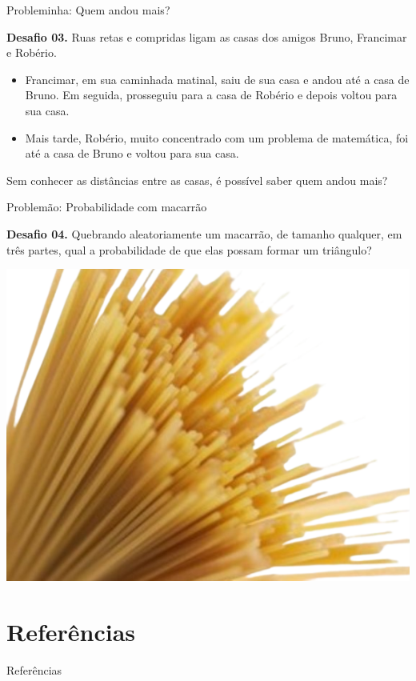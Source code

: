 \documentclass[12pt]{beamer}
\begin{document}
\begin{frame}{Probleminha: Quem andou mais?}

    \begin{exampleblock}{\textbf{Desafio 03.}}
        Ruas retas e compridas ligam as casas dos amigos Bruno, Francimar e Robério.

    \begin{itemize}\justifying
        \item Francimar, em sua caminhada matinal, saiu de sua casa e andou até a casa de Bruno. Em seguida, prosseguiu para a casa de Robério e depois voltou para sua casa.
        \item Mais tarde, Robério, muito concentrado com um problema de matemática, foi até a casa de Bruno e voltou para sua casa.
    \end{itemize} Sem conhecer as distâncias entre as casas, é possível saber quem andou mais?
    
    \end{exampleblock}

\end{frame}

\begin{frame}{Problemão: Probabilidade com macarrão}

    \begin{exampleblock}{\textbf{Desafio 04.}}
        \justifying
        Quebrando aleatoriamente um macarrão, de tamanho qualquer, em três partes, qual a probabilidade de que elas possam formar um triângulo?

        \begin{center}
            \includegraphics[scale=0.3]{imagens/macarrao_rmvbg.png}
        \end{center}
    
    \end{exampleblock}
   
\end{frame}




\section{Referências}

\begin{frame}{Referências}
	

\end{frame}
\end{document}
